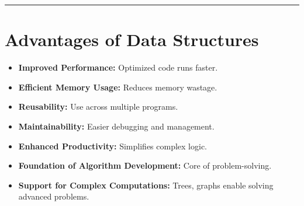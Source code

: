\vspace{0.5cm}
\hrule
\vspace{0.5cm}

\section*{\Large \textbf{Advantages of Data Structures}}
\begin{itemize}
    \item \textbf{Improved Performance:} Optimized code runs faster.
    \item \textbf{Efficient Memory Usage:} Reduces memory wastage.
    \item \textbf{Reusability:} Use across multiple programs.
    \item \textbf{Maintainability:} Easier debugging and management.
    \item \textbf{Enhanced Productivity:} Simplifies complex logic.
    \item \textbf{Foundation of Algorithm Development:} Core of problem-solving.
    \item \textbf{Support for Complex Computations:} Trees, graphs enable solving advanced problems.
\end{itemize}
